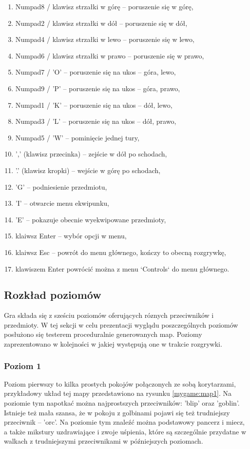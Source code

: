 \documentclass[12pt,twoside]{article}
\begin{document}
\begin{enumerate}
	\item Numpad8 / klawisz strzałki w górę -- poruszenie się w górę,
	\item Numpad2 / klawisz strzałki w dół -- poruszenie się w dół,
	\item Numpad4 / klawisz strzałki w lewo -- poruszenie się w lewo,
	\item Numpad6 / klawisz strzałki w prawo -- poruszenie się w prawo,
	\item Numpad7 / 'O' -- poruszenie się na ukos -- góra, lewo,
	\item Numpad9 / 'P' -- poruszenie się na ukos -- góra, prawo,
	\item Numpad1 / 'K' -- poruszenie się na ukos -- dół, lewo,
	\item Numpad3 / 'L' -- poruszenie się na ukos -- dół, prawo,
	\item Numpad5 / 'W' -- pominięcie jednej tury,
	\item ',' (klawisz przecinka) -- zejście w dół po schodach,
	\item '.' (klawisz kropki) -- wejście w górę po schodach,
	\item 'G' -- podniesienie przedmiotu,
	\item 'I' -- otwarcie menu ekwipunku,
	\item 'E' -- pokazuje obecnie wyekwipowane przedmioty,
	\item klaiwsz Enter -- wybór opcji w menu,
	\item klaiwsz Esc -- powrót do menu głównego, kończy to obecną rozgrywkę,
	\item klawiszem Enter powrócić można z menu `Controls` do menu głównego.
\end{enumerate}


\subsection{Rozkład poziomów}
Gra składa się z sześciu poziomów oferujących róznych przeciwników i przedmioty. W tej sekcji w celu prezentacji wyglądu poszczególnych poziomów posłużono się testerem proceduralnie generowanych map. Poziomy zaprezentowano w kolejności w jakiej występują one w trakcie rozgrywki.

\subsubsection{Poziom 1}
Poziom pierwszy to kilka prostych pokojów połączonych ze sobą korytarzami, przykładowy układ tej mapy przedstawiono na rysunku \ref{mygame:map1}. Na poziomie tym napotkać można najprostszych przeciwników: 'blip' oraz 'goblin'. Istnieje też mała szansa, że w pokoju z golbinami pojawi się też trudniejszy przeciwnik -- 'orc'. Na poziomie tym znaleźć można podstawowy pancerz i miecz, a także mikstury uzdrawiające i zwoje uśpienia, które są szczególnie przydatne w walkach z trudniejszymi przeciwnikami w późniejszych poziomach.
\end{document}
